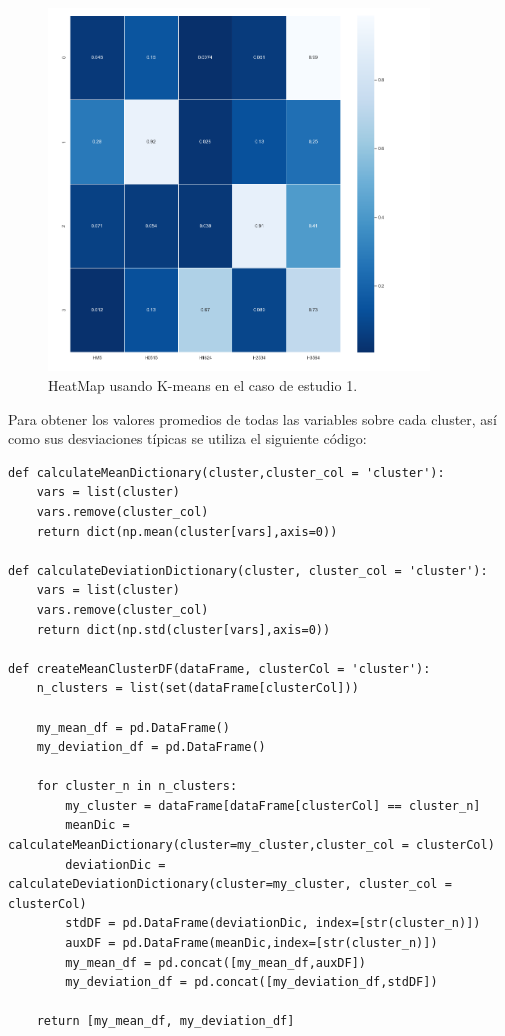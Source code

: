 	\begin{figure}[htb]
		\centering
		\includegraphics[width=0.9\textwidth]{./imagenes/caso1/heatmap_caso1_K-means}
		\caption{HeatMap usando K-means en el caso de estudio 1.} \label{fig:1}
	\end{figure}

	Para obtener los valores promedios de todas las variables sobre cada cluster, así como sus 
	desviaciones típicas se utiliza el siguiente código: \\

	\lstset{language=python}
	\begin{lstlisting}[frame=single]
def calculateMeanDictionary(cluster,cluster_col = 'cluster'):
	vars = list(cluster)
	vars.remove(cluster_col)
	return dict(np.mean(cluster[vars],axis=0))

def calculateDeviationDictionary(cluster, cluster_col = 'cluster'):
	vars = list(cluster)
	vars.remove(cluster_col)
	return dict(np.std(cluster[vars],axis=0))

def createMeanClusterDF(dataFrame, clusterCol = 'cluster'):
	n_clusters = list(set(dataFrame[clusterCol]))

	my_mean_df = pd.DataFrame()
	my_deviation_df = pd.DataFrame()

	for cluster_n in n_clusters:
		my_cluster = dataFrame[dataFrame[clusterCol] == cluster_n]
		meanDic = calculateMeanDictionary(cluster=my_cluster,cluster_col = clusterCol)
		deviationDic = calculateDeviationDictionary(cluster=my_cluster, cluster_col = clusterCol)
		stdDF = pd.DataFrame(deviationDic, index=[str(cluster_n)])
		auxDF = pd.DataFrame(meanDic,index=[str(cluster_n)])
		my_mean_df = pd.concat([my_mean_df,auxDF])
		my_deviation_df = pd.concat([my_deviation_df,stdDF])

	return [my_mean_df, my_deviation_df]
	\end{lstlisting}


